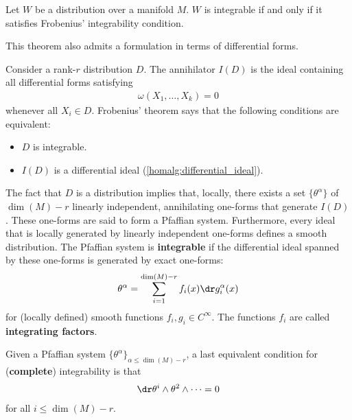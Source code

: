     \begin{theorem}\label{bundle:frobenius}
        Let $W$ be a distribution over a manifold $M$. $W$ is integrable if and only if it satisfies Frobenius' integrability condition.
    \end{theorem}

    This theorem also admits a formulation in terms of differential forms.
    \begin{property}\label{bundle:differential_frobenius}
        Consider a rank-$r$ distribution $D$. The annihilator $I(D)$ is the ideal containing all differential forms satisfying
        \begin{gather}
            \omega(X_1,\ldots,X_k) = 0
        \end{gather}
        whenever all $X_i\in D$. Frobenius' theorem says that the following conditions are equivalent:
        \begin{itemize}
            \item $D$ is integrable.
            \item $I(D)$ is a differential ideal (\cref{homalg:differential_ideal}).
        \end{itemize}
    \end{property}

    \begin{property}\label{bundle:pfaff}
        The fact that $D$ is a distribution implies that, locally, there exists a set $\{\theta^\alpha\}$ of $\dim(M)-r$ linearly independent, annihilating one-forms that generate $I(D)$. These one-forms are said to form a Pfaffian system. Furthermore, every ideal that is locally generated by linearly independent one-forms defines a smooth distribution. The Pfaffian system is \textbf{integrable} if the differential ideal spanned by these one-forms is generated by exact one-forms:
        \begin{gather}
            \theta^\alpha = \sum_{i=1}^{\dim(M)-r}f_i(x)\dr g_i^\alpha(x)
        \end{gather}
        for (locally defined) smooth functions $f_i,g_i\in C^\infty$. The functions $f_i$ are called \textbf{integrating factors}.

        Given a Pfaffian system $\{\theta^\alpha\}_{\alpha\leq\dim(M)-r}$, a last equivalent condition for (\textbf{complete}) integrability is that
        \begin{gather}
            \label{bundle:integrable_wedge_condition}
            \dr\theta^i\wedge\theta^2\wedge\cdots = 0
        \end{gather}
        for all $i\leq \dim(M)-r$.
    \end{property}

